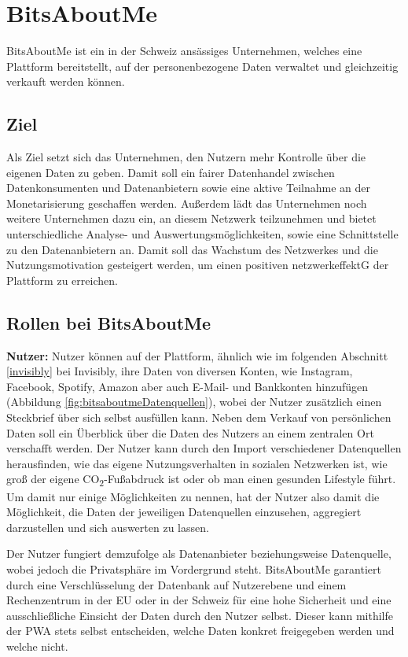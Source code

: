 \section{BitsAboutMe}
BitsAboutMe ist ein in der Schweiz ansässiges Unternehmen, welches eine Plattform bereitstellt, auf der personenbezogene Daten verwaltet und gleichzeitig verkauft werden können.

\subsection{Ziel}
Als Ziel setzt sich das Unternehmen, den Nutzern mehr Kontrolle über die eigenen Daten zu geben. Damit soll ein fairer Datenhandel zwischen Datenkonsumenten und Datenanbietern sowie eine aktive Teilnahme an der Monetarisierung geschaffen werden. Außerdem lädt das Unternehmen noch weitere Unternehmen dazu ein, an diesem Netzwerk teilzunehmen und bietet unterschiedliche Analyse- und Auswertungsmöglichkeiten, sowie eine Schnittstelle zu den Datenanbietern an. Damit soll das Wachstum des Netzwerkes und die Nutzungsmotivation gesteigert werden, um einen positiven \gls{netzwerkeffektG} der Plattform zu erreichen.

\subsection{Rollen bei BitsAboutMe}
\textbf{Nutzer:} Nutzer können auf der Plattform, ähnlich wie im folgenden Abschnitt \ref{invisibly} bei Invisibly, ihre Daten von diversen Konten, wie Instagram, Facebook, Spotify, Amazon aber auch E-Mail- und Bankkonten hinzufügen (Abbildung \ref{fig:bitsaboutmeDatenquellen}), wobei der Nutzer zusätzlich einen Steckbrief über sich selbst ausfüllen kann. Neben dem Verkauf von persönlichen Daten soll ein Überblick über die Daten des Nutzers an einem zentralen Ort verschafft werden. Der Nutzer kann durch den Import verschiedener Datenquellen herausfinden, wie das eigene Nutzungsverhalten in sozialen Netzwerken ist, wie groß der eigene CO\textsubscript{2}-Fußabdruck ist oder ob man einen gesunden Lifestyle führt. Um damit nur einige Möglichkeiten zu nennen, hat der Nutzer also damit die Möglichkeit, die Daten der jeweiligen Datenquellen einzusehen, aggregiert darzustellen und sich auswerten zu lassen. \newline

\noindent Der Nutzer fungiert demzufolge als Datenanbieter beziehungsweise Datenquelle, wobei jedoch die Privatsphäre im Vordergrund steht. BitsAboutMe garantiert durch eine Verschlüsselung der Datenbank auf Nutzerebene und einem Rechenzentrum in der EU oder in der Schweiz für eine hohe Sicherheit und eine ausschließliche Einsicht der Daten durch den Nutzer selbst. Dieser kann mithilfe der \gls{PWA} stets selbst entscheiden, welche Daten konkret freigegeben werden und welche nicht.\newline

